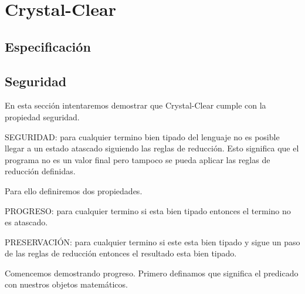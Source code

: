 \chapter{Crystal-Clear}

\section{Especificación}

\section{Seguridad}

En esta sección intentaremos demostrar que Crystal-Clear cumple con la propiedad
seguridad.

\begin{definition}
    SEGURIDAD: para cualquier termino bien tipado del lenguaje no es
    posible llegar a un estado atascado siguiendo las reglas de reducción.
     Esto significa que el programa no es un valor final pero tampoco se 
    pueda aplicar las reglas de reducción definidas.
\end{definition}

Para ello definiremos dos propiedades.

\begin{definition}
    PROGRESO: para cualquier termino si esta bien tipado entonces el termino no es atascado.
\end{definition}
\begin{definition}
    PRESERVACIÓN: para cualquier termino si este esta bien tipado y sigue un paso de las reglas
    de reducción entonces el resultado esta bien tipado.
\end{definition}

Comencemos demostrando progreso. Primero definamos que significa el predicado
con nuestros objetos matemáticos.

